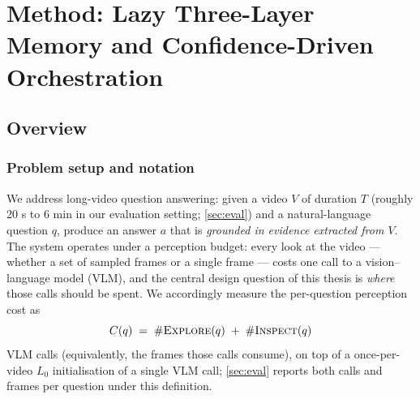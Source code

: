 %
%

\section{Method: Lazy Three-Layer Memory and Confidence-Driven Orchestration}
\label{sec:method}

\subsection{Overview}
\label{subsec:overview}

\subsubsection{Problem setup and notation}
\label{subsubsec:setup}

We address long-video question answering: given a video $V$ of duration $T$ (roughly 20 s to
6 min in our evaluation setting; \cref{sec:eval}) and a natural-language question $q$, produce an answer $a$
that is \emph{grounded in evidence extracted from $V$}. The system operates under a perception budget:
every look at the video --- whether a set of sampled frames or a single frame --- costs one call to a
vision--language model (VLM), and the central design question of this thesis is \emph{where} those calls
should be spent. We accordingly measure the per-question perception cost as
%
\begin{equation}
\label{eq:cost}
C(q) \;=\; \#\textsc{Explore}(q) \;+\; \#\textsc{Inspect}(q)
\end{equation}
%
VLM calls (equivalently, the frames those calls consume), on top of a once-per-video $L_0$
initialisation of a single VLM call; \cref{sec:eval} reports both calls and frames per question under this
definition.

